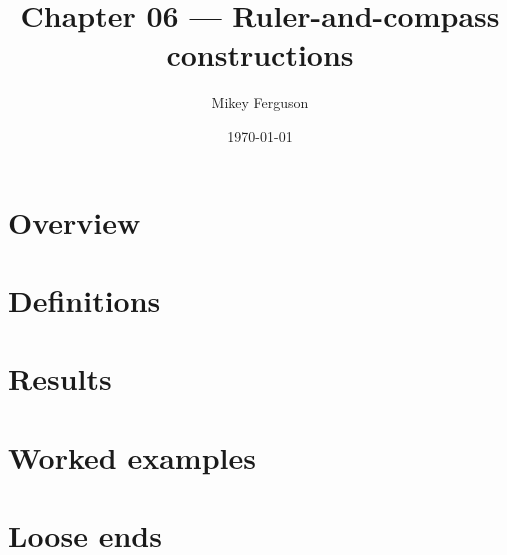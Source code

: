 \documentclass[11pt]{article}
\title{Chapter 06 --- Ruler-and-compass constructions}
\author{Mikey Ferguson}
\date{\today}
\begin{document}
\maketitle
\tableofcontents
\bigskip

\section{Overview}

\section{Definitions}

\section{Results}

\section{Worked examples}

\section{Loose ends}
\end{document}
